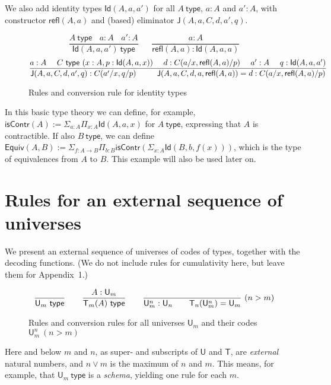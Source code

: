 \documentclass[11pt,a4paper]{article}
\theoremstyle{definition}
\newcommand{\Id}{\mathsf{Id}}
\newcommand{\UU}{\mathsf{U}}
\newcommand{\JJ}{\mathsf{J}}
\newcommand{\type}{\mathsf{type}}
\newcommand{\mypi}[3]{\Pi_{#1:#2}#3}
\newcommand{\mysig}[3]{\Sigma_{#1:#2}#3}
\newcommand{\sapp}[2]{{#1(#2)}} %
\newcommand{\Idapp}[3]{\sapp{\Id}{#1,#2,#3}}
\newcommand{\Rfapp}[2]{\sapp{\refl}{#1,#2}}
\newcommand{\Japp}[6]{\sapp{\JJ}{#1,#2,#3,#4,#5,#6}}
\newcommand{\T}{\mathsf{T}}
\newcommand{\Equiv}{\mathsf{Equiv}}
\newcommand{\isContr}{\mathsf{isContr}}
\newcommand{\refl}{\mathsf{refl}}
\begin{document}
We also add identity types $\Idapp{A}{a}{a'}$ for all $A~\type$,
$a:A$ and $a':A$, with constructor $\Rfapp{A}{a}$ and (based) eliminator
$\Japp{A}{a}{C}{d}{a'}{q}$.

\begin{figure}[H]
  \caption{Rules and conversion rule for identity types}\label{fig:typeId}
$$
\frac{A~\type ~~~~ a:A ~~~~ a':A}{\Idapp{A}{a}{a'}~\type}~~~~~~~
\frac{a:A}{\Rfapp{A}{a}:\Idapp{A}{a}{a}}
$$
$$
\frac{a:A~~~~C~\type~(x:A,p:\Idapp{A}{a}{x})~~~~d:C(a/x,\Rfapp{A}{a}/p)
~~~~a':A~~~~q:\Idapp{A}{a}{a'}}
{\Japp{A}{a}{C}{d}{a'}{q}: C(a'/x,q/p) ~~~~~~~~
 \Japp{A}{a}{C}{d}{a}{\Rfapp{A}{a}} = d : C(a/x,\Rfapp{A}{a}/p)}
\belowdisplayshortskip 0pt
$$
\end{figure}

In this basic type theory we can define, for example,
$\isContr(A) := \mysig{a}{A}{\mypi{x}{A}{\Id(A,a,x)}}$
for $A~\type$, expressing that $A$ is contractible.
If also $B~\type$, we can define $\Equiv(A,B) :=
\mysig{f}{A\to B}{\mypi{b}{B}{\isContr(\mysig{x}{A}{\Id(B,b,f(x))})}}$,
which is the type of equivalences from $A$ to $B$. This example
will also be used later on.

\section{Rules for an external sequence of universes}\label{sec:external}


We present an external sequence of universes of codes of types, together
with the decoding functions. (We do not include rules for cumulativity here, but leave them for Appendix~1.)

\begin{figure}[H]
  \caption{Rules and conversion rules for all universes $\UU_m$ and their codes $\UU^{n}_{m}~(n>m)$}\label{fig:typeU}
$$
\frac{}{\UU_m~\type}~~~~~~
\frac{A:\UU_{m}}{\T_{m}(A)~\type}~~~~~~
\frac{}{\UU^{n}_{m}:\UU_{n}~~~~~~\T_{n}({\UU^{n}_{m}}) = \UU_{m}}{~(n>m)}
\belowdisplayshortskip 0pt
$$
\end{figure}

Here and below $m$ and $n$, as super- and subscripts of $\UU$ and $\T$,
are \emph{external} natural numbers, and $n \vee m$ is the
maximum of $n$ and $m$. This means, for example, that $\UU_m~\type$ is
a \emph{schema}, yielding one rule for each $m$.
\end{document}
